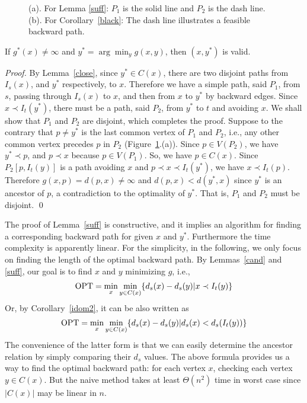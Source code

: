 \begin{figure}[t]
\begin{center}
\caption{(a). For Lemma \ref{suff}: $P_1$ is the solid line and $P_2$ is the dash line.
(b). For Corollary~\ref{black}: The dash line illustrates a feasible backward path.}
\label{backfig}
\end{center}
\end{figure}
\begin{lemma}\label{suff}
If $g^*(x)\neq \infty$ and $y^*=\arg\min_y g(x,y)$, then $(x,y^*)$ is valid.
\end{lemma}
\begin{proof}
By Lemma~\ref{close}, since $y^*\in C(x)$, there are two disjoint paths from $I_s(x)$, and $y^*$ respectively, to $x$. 
Therefore we have a simple path, said $P_1$, from $s$, passing through $I_s(x)$ to $x$, and then from $x$ to $y^*$ by backward edges.
Since $x\prec I_t(y^*)$, there must be a path, said $P_2$, from $y^*$ to $t$ and avoiding $x$.
We shall show that $P_1$ and $P_2$ are disjoint, which completes the proof.
Suppose to the contrary that $p\neq y^*$ is the last common vertex of $P_1$ and $P_2$, i.e., any other common vertex
precedes $p$ in $P_2$ (Figure~\ref{backfig}.(a)). 
Since $p\in V(P_2)$, we have $y^*\prec p$, and $p\prec x$ because $p\in V(P_1)$. So, we have $p\in C(x)$.
Since $P_2[p,I_t(y)]$ is a path avoiding $x$ and $p\prec x\prec I_t(y^*)$, we have $x\prec I_t(p)$.
Therefore $g(x,p)=d(p,x)\neq\infty$ and $d(p,x)<d(y^*,x)$ since $y^*$ is an ancestor of $p$, 
a contradiction to the optimality of $y^*$.
That is, $P_1$ and $P_2$ must be disjoint.
\qed
\end{proof}
The proof of Lemma~\ref{suff} is constructive, and it implies an algorithm for finding a corresponding backward path for given $x$ and $y^*$. Furthermore the time complexity is apparently linear.
For the simplicity, in the following, we only focus on finding the length of the optimal backward path.
By Lemmas~\ref{cand} and \ref{suff}, our goal is to find $x$ and $y$ minimizing $g$, i.e., 
\begin{eqnarray}
{\rm OPT} =\min_x\min_{y\in C(x)}\{d_s(x)-d_s(y)| x\prec I_t(y) \} \label{obj1}
\end{eqnarray}
Or, by Corollary~\ref{idom2}, it can be also written as 
\begin{eqnarray}
{\rm OPT} =\min_x\min_{y\in C(x)}\{d_s(x)-d_s(y)| d_s(x)< d_s(I_t(y)) \} \label{obj2}
\end{eqnarray}
The convenience of the latter form is that we can easily determine the ancestor relation by simply comparing their $d_s$ values.
The above formula provides us a way to find the optimal backward path: for each vertex $x$, checking each vertex $y\in C(x)$. But the naive method takes at least $\Theta(n^2)$ time in worst case since $|C(x)|$ may be linear in $n$. 


